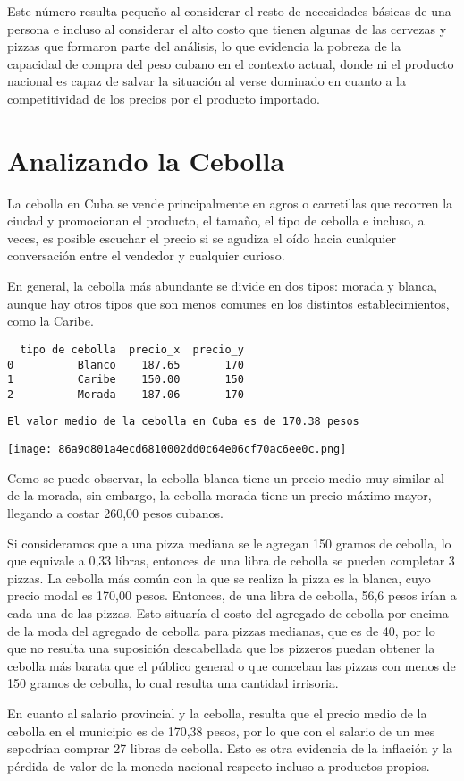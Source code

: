 Este número resulta pequeño al considerar el resto de necesidades
básicas de una persona e incluso al considerar el alto costo que tienen
algunas de las cervezas y pizzas que formaron parte del análisis, lo que
evidencia la pobreza de la capacidad de compra del peso cubano en el
contexto actual, donde ni el producto nacional es capaz de salvar la
situación al verse dominado en cuanto a la competitividad de los precios
por el producto importado.

\hypertarget{analizando-la-cebolla}{%
\section{Analizando la Cebolla}\label{analizando-la-cebolla}}

La cebolla en Cuba se vende principalmente en agros o carretillas que
recorren la ciudad y promocionan el producto, el tamaño, el tipo de
cebolla e incluso, a veces, es posible escuchar el precio si se agudiza
el oído hacia cualquier conversación entre el vendedor y cualquier
curioso.

En general, la cebolla más abundante se divide en dos tipos: morada y
blanca, aunque hay otros tipos que son menos comunes en los distintos
establecimientos, como la Caribe.


\begin{verbatim}
  tipo de cebolla  precio_x  precio_y
0          Blanco    187.65       170
1          Caribe    150.00       150
2          Morada    187.06       170
\end{verbatim}


\begin{verbatim}
El valor medio de la cebolla en Cuba es de 170.38 pesos
\end{verbatim}


\texttt{[image: 86a9d801a4ecd6810002dd0c64e06cf70ac6ee0c.png]}

Como se puede observar, la cebolla blanca tiene un precio medio muy
similar al de la morada, sin embargo, la cebolla morada tiene un precio
máximo mayor, llegando a costar 260,00 pesos cubanos.

Si consideramos que a una pizza mediana se le agregan 150 gramos de
cebolla, lo que equivale a 0,33 libras, entonces de una libra de cebolla
se pueden completar 3 pizzas. La cebolla más común con la que se realiza
la pizza es la blanca, cuyo precio modal es 170,00 pesos. Entonces, de
una libra de cebolla, 56,6 pesos irían a cada una de las pizzas. Esto
situaría el costo del agregado de cebolla por encima de la moda del
agregado de cebolla para pizzas medianas, que es de 40, por lo que no
resulta una suposición descabellada que los pizzeros puedan obtener la
cebolla más barata que el público general o que conceban las pizzas con
menos de 150 gramos de cebolla, lo cual resulta una cantidad irrisoria.

En cuanto al salario provincial y la cebolla, resulta que el precio
medio de la cebolla en el municipio es de 170,38 pesos, por lo que con
el salario de un mes sepodrían comprar 27 libras de cebolla. Esto es
otra evidencia de la inflación y la pérdida de valor de la moneda
nacional respecto incluso a productos propios.
